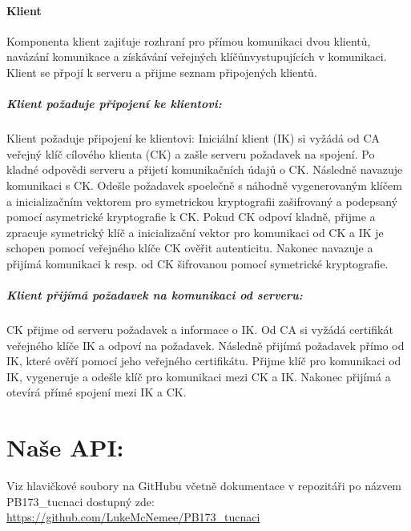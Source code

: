 \documentclass[a4paper, 12pt, titlepage]{article}
\begin{document}
\paragraph{Klient}
Komponenta klient zajiťuje rozhraní pro přímou komunikaci dvou klientů, navázání 
komunikace a získávání veřejných klíčůnvystupujících v komunikaci. Klient se 
přpojí k serveru a přijme seznam připojených klientů.

\subparagraph{Klient požaduje připojení ke klientovi:}
Klient požaduje připojení ke klientovi:
Iniciální klient (IK) si vyžádá od CA veřejný klíč cílového klienta (CK) 
a zašle serveru požadavek na spojení. Po kladné odpovědi serveru a přijetí 
komunikačních údajů o CK. Následně navazuje komunikaci s CK. Odešle požadavek 
spoelečně s náhodně vygenerovaným klíčem a inicializačním vektorem pro 
symetrickou kryptografii zašifrovaný a podepsaný pomocí asymetrické kryptografie 
k CK. Pokud CK odpoví kladně, přijme a zpracuje symetrický klíč a inicializační 
vektor pro komunikaci od CK a IK je schopen pomocí
veřejného klíče CK ověřit autenticitu. Nakonec navazuje a přijímá 
komunikaci k resp. od CK šifrovanou pomocí
symetrické kryptografie. 

\subparagraph{Klient přijímá požadavek na komunikaci od serveru:}
CK přijme od serveru požadavek a informace o IK. Od CA si vyžádá 
certifikát veřejného klíče IK a odpoví na požadavek. Následně přijímá požadavek 
přímo od IK, které ověří pomocí jeho veřejného certifikátu. Přijme klíč pro 
komunikaci od IK, vygeneruje a odešle klíč pro komunikaci mezi CK a IK. Nakonec 
přijímá a otevírá přímé spojení mezi IK a CK.

\section{Naše API:}

Viz hlavičkové soubory na GitHubu včetně dokumentace v repozitáři po názvem 
PB173\_tucnaci dostupný zde: \url{https://github.com/LukeMcNemee/PB173\_tucnaci}
\end{document}
